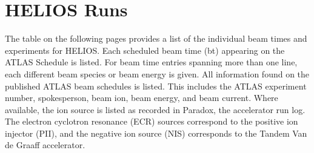 
\chapter{HELIOS Runs}
\label{runs}
The table on the following pages provides a list of the individual beam times and experiments for HELIOS.
Each scheduled beam time (bt) appearing on the ATLAS Schedule is listed.
For beam time entries spanning more than one line, each different beam species or beam energy is given.
All information found on the published ATLAS beam schedules is listed.
This includes the ATLAS experiment number, spokesperson, beam ion, beam energy, and beam current.
Where available, the ion source %
is listed as recorded in Paradox, the accelerator run log.
The electron cyclotron resonance (ECR) sources correspond to the positive ion injector (PII), and the negative ion source (NIS) corresponds to the Tandem Van de Graaff accelerator.

